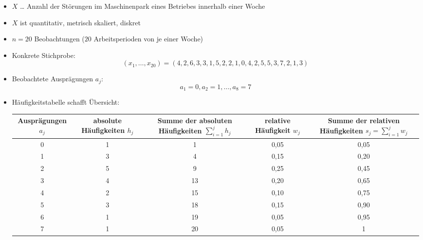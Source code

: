 \begin{itemize}
\item $X$ … Anzahl der Störungen im Maschinenpark eines Betriebes innerhalb einer Woche
\item $X$ ist quantitativ, metrisch skaliert, diskret
\item $n=20$ Beobachtungen ($20$ Arbeitsperioden von je einer Woche)
\item Konkrete Stichprobe:
$$(x_1, \ldots, x_{20})=(4,2,6,3,3,1,5,2,2,1,0,4,2,5,5,3,7,2,1,3)$$
\item Beobachtete Ausprägungen $a_j$:
$$a_1=0, a_2 = 1, \ldots , a_8=7$$
\item Häufigkeitstabelle schafft Übersicht:\\
\begin{tabular}{C{0.15} C{0.19} C{0.19} C{0.19} C{0.19}}
Ausprägungen $a_j$ & absolute Häufigkeiten $h_j$ & Summe der absoluten Häufigkeiten $\sum_{i=1}^j h_j$ & relative Häufigkeit $w_j$ & Summe der relativen Häufigkeiten $s_j=\sum_{i=1}^j w_j$\\ &	1 & 1 & 0,05 & 0,05\\
1 & 3 & 4 & 0,15 & 0,20\\
2 & 5 & 9 & 0,25 & 0,45\\
3 & 4 & 13 & 0,20 & 0,65\\
4 & 2 & 15 & 0,10 & 0,75\\
5 & 3 & 18 & 0,15 & 0,90\\
6 & 1 & 19 & 0,05 & 0,95\\
7 & 1 & 20  & 0,05 & 1
\end{tabular}

\end{itemize}
